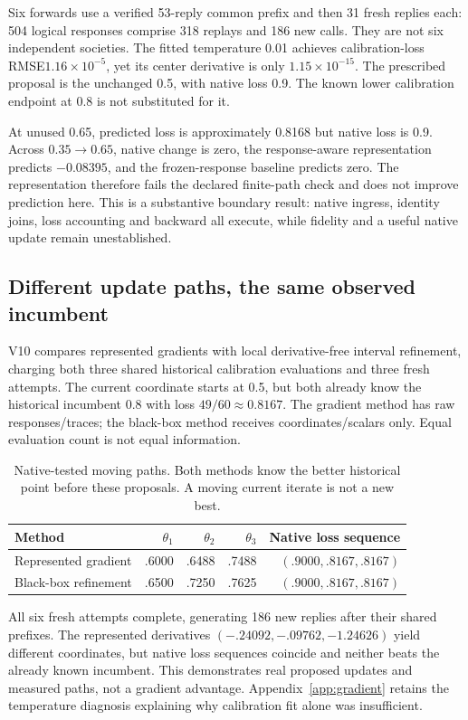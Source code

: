 Six forwards use a verified 53-reply common prefix and then 31 fresh replies each:
504 logical responses comprise 318 replays and 186 new calls. They are not six
independent societies. The fitted temperature 0.01 achieves calibration-loss
RMSE$1.16\times 10^{-5}$, yet its center derivative is only
$1.15\times 10^{-15}$. The prescribed proposal is the unchanged 0.5, with native
loss 0.9. The known lower calibration endpoint at 0.8 is not substituted for it.

At unused 0.65, predicted loss is approximately 0.8168 but native loss is 0.9.
Across $0.35\to 0.65$, native change is zero, the response-aware representation
predicts $-0.08395$, and the frozen-response baseline predicts zero. The
representation therefore fails the declared finite-path check and does not
improve prediction here. This is a substantive boundary result: native
ingress, identity joins, loss accounting and backward all execute, while
fidelity and a useful native update remain unestablished.

\subsection{Different update paths, the same observed incumbent}
V10 compares represented gradients with local derivative-free interval
refinement, charging both three shared historical calibration evaluations
and three fresh attempts. The current coordinate starts at 0.5, but both already
know the historical incumbent 0.8 with loss $49/60\approx 0.8167$.
The gradient method has raw responses/traces; the black-box method receives
coordinates/scalars only. Equal evaluation count is not equal information.

\begin{table}[t]\centering\small
\caption{Native-tested moving paths. Both methods know the better historical
point before these proposals. A moving current iterate is not a new best.}
\label{tab:integrated-method-paths}
\begin{tabular}{lrrrr}\toprule
Method & $\theta_1$ & $\theta_2$ & $\theta_3$ & Native loss sequence\\\midrule
Represented gradient & .6000 & .6488 & .7488 & $(.9000,.8167,.8167)$\\
Black-box refinement & .6500 & .7250 & .7625 & $(.9000,.8167,.8167)$\\\bottomrule
\end{tabular}\end{table}

All six fresh attempts complete, generating 186 new replies after their shared
prefixes. The represented derivatives $(-.24092,-.09762,-1.24626)$ yield different
coordinates, but native loss sequences coincide and neither beats the already
known incumbent. This demonstrates real proposed updates and measured paths,
not a gradient advantage. Appendix~\ref{app:gradient} retains the temperature
diagnosis explaining why calibration fit alone was insufficient.


